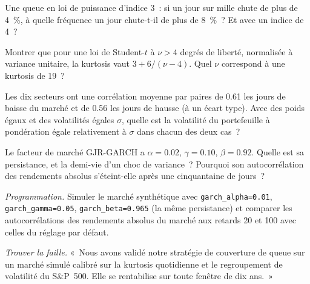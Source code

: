 \begin{exercise}[$\star$]\label{exo:rs:stylised-facts-of-returns:3}
Une queue en loi de puissance d'indice 3~: si un jour sur mille chute de plus de 4~\%, à quelle fréquence un jour chute-t-il de plus de 8~\%~? Et avec un
indice de 4~?
\end{exercise}

\begin{exercise}[$\star\star$]\label{exo:rs:stylised-facts-of-returns:4}
Montrer que pour une loi de Student-$t$ à $\nu > 4$ degrés de liberté, normalisée à variance unitaire, la kurtosis vaut $3 + 6/(\nu - 4)$. Quel $\nu$
correspond à une kurtosis de 19~?
\end{exercise}

\begin{exercise}[$\star\star$]\label{exo:rs:stylised-facts-of-returns:5}
Les dix secteurs ont une corrélation moyenne par paires de 0.61 les jours de baisse du marché et de 0.56 les jours de hausse (à un
écart type). Avec des poids égaux et des volatilités égales $\sigma$, quelle est la volatilité du portefeuille à pondération égale relativement à
$\sigma$ dans chacun des deux cas~?
\end{exercise}

\begin{exercise}[$\star\star$]\label{exo:rs:stylised-facts-of-returns:6}
Le facteur de marché GJR-GARCH a $\alpha = 0.02$, $\gamma = 0.10$, $\beta = 0.92$. Quelle est sa persistance, et la demi-vie d'un choc de
variance~? Pourquoi son autocorrélation des rendements absolus s'éteint-elle après une cinquantaine de jours~?
\end{exercise}

\begin{exercise}[$\star\star\star$]\label{exo:rs:stylised-facts-of-returns:7}
\emph{Programmation.} Simuler le marché synthétique avec \texttt{garch\_alpha=0.01}, \texttt{garch\_gamma=0.05},
\texttt{garch\_beta=0.965} (la même persistance) et comparer les autocorrélations des rendements absolus du marché aux retards 20 et 100
avec celles du réglage par défaut.
\end{exercise}

\begin{exercise}[$\star\star\star$]\label{exo:rs:stylised-facts-of-returns:8}
\emph{Trouver la faille.} «~Nous avons validé notre stratégie de couverture de queue sur un marché simulé calibré sur la kurtosis quotidienne et le regroupement de
volatilité du S\&P~500. Elle se rentabilise sur toute fenêtre de dix ans.~»
\end{exercise}

